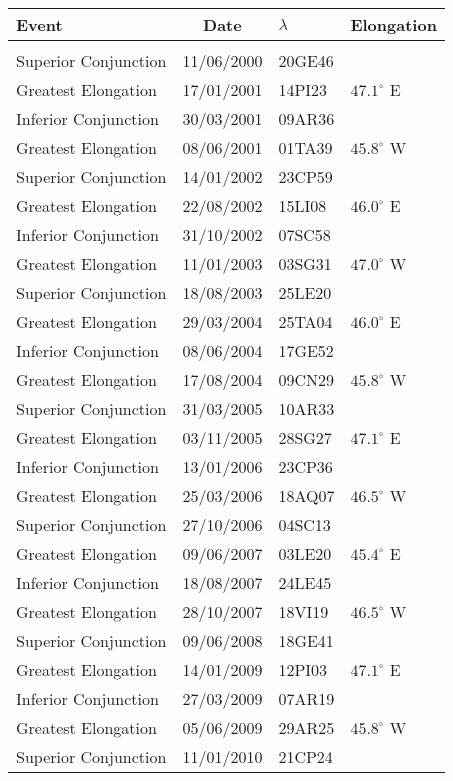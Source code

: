 \newpage
\begin{table}\centering
{\small\begin{tabular}{lcll}
Event & Date & $\lambda$& Elongation \\\hline
&&&\\[-1.75ex]
Superior Conjunction & 11/06/2000 & 20GE46&\\
Greatest Elongation & 17/01/2001 & 14PI23 & $47.1^\circ$ E\\
Inferior Conjunction & 30/03/2001 & 09AR36&\\
Greatest Elongation & 08/06/2001 & 01TA39 & $45.8^\circ$ W\\
Superior Conjunction & 14/01/2002 & 23CP59&\\
Greatest Elongation & 22/08/2002 & 15LI08 & $46.0^\circ$ E\\
Inferior Conjunction & 31/10/2002 & 07SC58&\\
Greatest Elongation & 11/01/2003 & 03SG31 & $47.0^\circ$ W\\
Superior Conjunction & 18/08/2003 & 25LE20&\\
Greatest Elongation & 29/03/2004 & 25TA04 & $46.0^\circ$ E\\
Inferior Conjunction & 08/06/2004 & 17GE52&\\
Greatest Elongation & 17/08/2004 & 09CN29 & $45.8^\circ$ W\\
Superior Conjunction & 31/03/2005 & 10AR33&\\
Greatest Elongation & 03/11/2005 & 28SG27 & $47.1^\circ$ E\\
Inferior Conjunction & 13/01/2006 & 23CP36&\\
Greatest Elongation & 25/03/2006 & 18AQ07 & $46.5^\circ$ W\\
Superior Conjunction & 27/10/2006 & 04SC13&\\
Greatest Elongation & 09/06/2007 & 03LE20 & $45.4^\circ$ E\\
Inferior Conjunction & 18/08/2007 & 24LE45&\\
Greatest Elongation & 28/10/2007 & 18VI19 & $46.5^\circ$ W\\
Superior Conjunction & 09/06/2008 & 18GE41&\\
Greatest Elongation & 14/01/2009 & 12PI03 & $47.1^\circ$ E\\
Inferior Conjunction & 27/03/2009 & 07AR19&\\
Greatest Elongation & 05/06/2009 & 29AR25 & $45.8^\circ$ W\\
Superior Conjunction & 11/01/2010 & 21CP24&\\

\end{tabular}}
\end{table}
